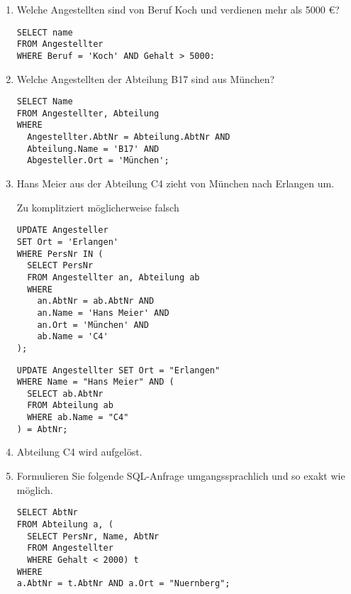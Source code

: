 \documentclass{lehramt-informatik-aufgabe}
\begin{document}
\begin{enumerate}


\item Welche Angestellten sind von Beruf Koch und verdienen mehr als
5000 €?

\begin{antwort}[muster]
\begin{verbatim}
SELECT name
FROM Angestellter
WHERE Beruf = 'Koch' AND Gehalt > 5000:
\end{verbatim}
\end{antwort}


\item Welche Angestellten der Abteilung B17 sind aus München?

\begin{antwort}[muster]
\begin{verbatim}
SELECT Name
FROM Angestellter, Abteilung
WHERE
  Angestellter.AbtNr = Abteilung.AbtNr AND
  Abteilung.Name = 'B17' AND
  Abgesteller.Ort = 'München';
\end{verbatim}
\end{antwort}


\item Hans Meier aus der Abteilung C4 zieht von München nach Erlangen um.

\begin{antwort}[falsch]
Zu komplitziert möglicherweise falsch
\begin{verbatim}
UPDATE Angesteller
SET Ort = 'Erlangen'
WHERE PersNr IN (
  SELECT PersNr
  FROM Angestellter an, Abteilung ab
  WHERE
    an.AbtNr = ab.AbtNr AND
    an.Name = 'Hans Meier' AND
    an.Ort = 'München' AND
    ab.Name = 'C4'
);
\end{verbatim}
\end{antwort}

\begin{antwort}[muster]
\begin{verbatim}
UPDATE Angestellter SET Ort = "Erlangen"
WHERE Name = "Hans Meier" AND (
  SELECT ab.AbtNr
  FROM Abteilung ab
  WHERE ab.Name = "C4"
) = AbtNr;
\end{verbatim}
\end{antwort}


\item Abteilung C4 wird aufgelöst.


\item Formulieren Sie folgende SQL-Anfrage umgangssprachlich und so
exakt wie möglich.

\begin{verbatim}
SELECT AbtNr
FROM Abteilung a, (
  SELECT PersNr, Name, AbtNr
  FROM Angestellter
  WHERE Gehalt < 2000) t
WHERE
a.AbtNr = t.AbtNr AND a.Ort = "Nuernberg";
\end{verbatim}

\end{enumerate}
\end{document}
